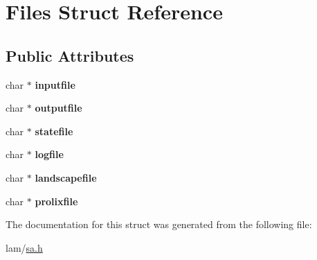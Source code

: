 \hypertarget{structFiles}{
\section{Files Struct Reference}
\label{structFiles}
}
\subsection*{Public Attributes}
\begin{DoxyCompactItemize}
\item 
\hypertarget{structFiles_ac715e47216186e520143afd7ac66bc31}{
char $\ast$ {\bfseries inputfile}}
\label{structFiles_ac715e47216186e520143afd7ac66bc31}

\item 
\hypertarget{structFiles_a26cfae9efcd5c8813c4c59d41d414ce6}{
char $\ast$ {\bfseries outputfile}}
\label{structFiles_a26cfae9efcd5c8813c4c59d41d414ce6}

\item 
\hypertarget{structFiles_a1628313d00f208eaa80ea0915ea4ebd9}{
char $\ast$ {\bfseries statefile}}
\label{structFiles_a1628313d00f208eaa80ea0915ea4ebd9}

\item 
\hypertarget{structFiles_af0fd332e20e29ea84c1985438416948e}{
char $\ast$ {\bfseries logfile}}
\label{structFiles_af0fd332e20e29ea84c1985438416948e}

\item 
\hypertarget{structFiles_a5a4ad000433fdaaef5e0086c46e49d42}{
char $\ast$ {\bfseries landscapefile}}
\label{structFiles_a5a4ad000433fdaaef5e0086c46e49d42}

\item 
\hypertarget{structFiles_a5a41eb6dc5a94ab9e98e136f676bf6c2}{
char $\ast$ {\bfseries prolixfile}}
\label{structFiles_a5a41eb6dc5a94ab9e98e136f676bf6c2}

\end{DoxyCompactItemize}


The documentation for this struct was generated from the following file:\begin{DoxyCompactItemize}
\item 
lam/\hyperlink{sa_8h}{sa.h}\end{DoxyCompactItemize}
